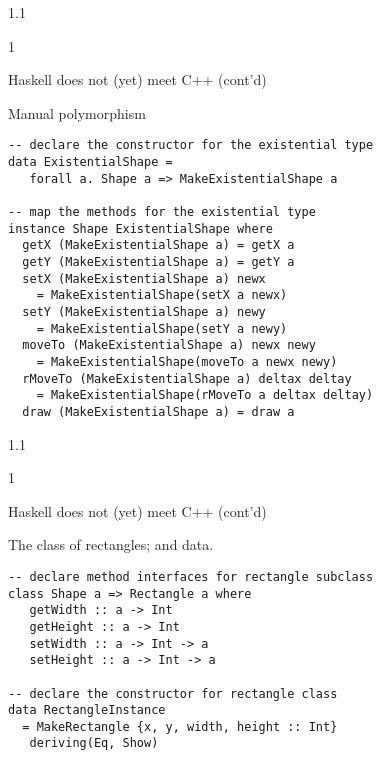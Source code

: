 \documentclass{slides}
\newenvironment{myslide}{\begin{slide}\color{Blue}\begin{boxedminipage}{1.1\hsize}\begin{boxedminipage}{1\hsize}\color{Black}
\vspace{-170\in}
}{%
\smallskip
\end{boxedminipage}
\end{boxedminipage}
\end{slide}}
\newenvironment{myslide}{\begin{slide}
}{%
\end{slide}}
\newenvironment{myslide}{\begin{slide}\color{White}\begin{boxedminipage}{1.1\hsize}\color{Black}
\vspace{-170\in}
}{%
\smallskip
\end{boxedminipage}
\end{slide}}
\newcommand{\header}[1]{{\large \color{Red} #1}}
\begin{document}



\begin{myslide}

\header{Haskell does not (yet) meet C++ (cont'd)}

Manual polymorphism

{\tiny

\begin{verbatim}
-- declare the constructor for the existential type
data ExistentialShape =
   forall a. Shape a => MakeExistentialShape a

-- map the methods for the existential type
instance Shape ExistentialShape where
  getX (MakeExistentialShape a) = getX a
  getY (MakeExistentialShape a) = getY a
  setX (MakeExistentialShape a) newx
    = MakeExistentialShape(setX a newx)
  setY (MakeExistentialShape a) newy
    = MakeExistentialShape(setY a newy)
  moveTo (MakeExistentialShape a) newx newy
    = MakeExistentialShape(moveTo a newx newy)
  rMoveTo (MakeExistentialShape a) deltax deltay
    = MakeExistentialShape(rMoveTo a deltax deltay)
  draw (MakeExistentialShape a) = draw a
\end{verbatim}

}

\end{myslide}






\begin{myslide}

\header{Haskell does not (yet) meet C++ (cont'd)}

The class of rectangles; and data.

{\tiny

\begin{verbatim}
-- declare method interfaces for rectangle subclass
class Shape a => Rectangle a where
   getWidth :: a -> Int
   getHeight :: a -> Int
   setWidth :: a -> Int -> a
   setHeight :: a -> Int -> a

-- declare the constructor for rectangle class
data RectangleInstance
  = MakeRectangle {x, y, width, height :: Int}
   deriving(Eq, Show)
\end{verbatim}

}

\end{myslide}
\end{document}
